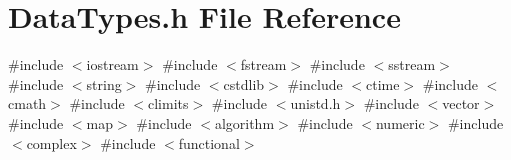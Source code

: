 \section{Data\+Types.\+h File Reference}
\label{_data_types_8h}
{\ttfamily \#include $<$iostream$>$}\newline
{\ttfamily \#include $<$fstream$>$}\newline
{\ttfamily \#include $<$sstream$>$}\newline
{\ttfamily \#include $<$string$>$}\newline
{\ttfamily \#include $<$cstdlib$>$}\newline
{\ttfamily \#include $<$ctime$>$}\newline
{\ttfamily \#include $<$cmath$>$}\newline
{\ttfamily \#include $<$climits$>$}\newline
{\ttfamily \#include $<$unistd.\+h$>$}\newline
{\ttfamily \#include $<$vector$>$}\newline
{\ttfamily \#include $<$map$>$}\newline
{\ttfamily \#include $<$algorithm$>$}\newline
{\ttfamily \#include $<$numeric$>$}\newline
{\ttfamily \#include $<$complex$>$}\newline
{\ttfamily \#include $<$functional$>$}\newline

